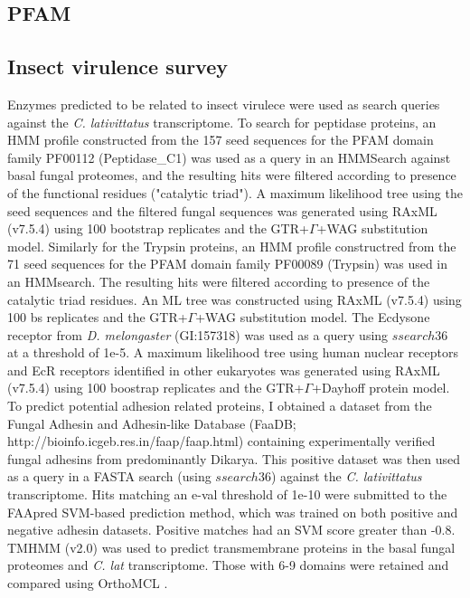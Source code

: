 \subsection*{PFAM}
\subsection*{Insect virulence survey}
Enzymes predicted to be related to insect virulece were used as search queries against the \textit{C. lativittatus} transcriptome. To search for peptidase proteins, an HMM profile constructed from the 157 seed sequences for the PFAM domain family PF00112 (Peptidase\_C1) was used as a query in an HMMSearch against basal fungal proteomes, and the resulting hits were filtered according to presence of the functional residues ("catalytic triad"). A maximum likelihood tree using the seed sequences and the filtered fungal sequences was generated using RAxML (v7.5.4) using 100 bootstrap replicates and the GTR+$\Gamma$+WAG substitution model. Similarly for the Trypsin proteins, an HMM profile constructred from the 71 seed sequences for the PFAM domain family PF00089 (Trypsin) was used in an HMMsearch. The resulting hits were filtered according to presence of the catalytic triad residues. An ML tree was constructed using RAxML (v7.5.4) using 100 bs replicates and the GTR+$\Gamma$+WAG substitution model. The Ecdysone receptor from \textit{D. melongaster} (GI:157318) was used as a query using $ssearch36$ at a threshold of 1e-5. A maximum likelihood tree using human nuclear receptors and EcR receptors identified in other eukaryotes was generated using RAxML (v7.5.4) \cite{Stamatakis2014} using 100 boostrap replicates and the GTR+$\Gamma$+Dayhoff protein model.\\
\indent To predict potential adhesion related proteins, I obtained a dataset from the Fungal Adhesin and Adhesin-like Database (FaaDB; http://bioinfo.icgeb.res.in/faap/faap.html) containing experimentally verified fungal adhesins from predominantly Dikarya. This positive dataset was then used as a query in a FASTA search (using $ssearch36$) against the \textit{C. lativittatus} transcriptome. Hits matching an e-val threshold of 1e-10 were submitted to the FAApred SVM-based prediction method, which was trained on both positive and negative adhesin datasets. Positive matches had an SVM score greater than -0.8.\\
\indent TMHMM (v2.0) \cite{Krogh2011} was used to predict transmembrane proteins in the basal fungal proteomes and \textit{C. lat} transcriptome. Those with 6-9 domains were retained and compared using OrthoMCL \cite{Li2003}. \\

